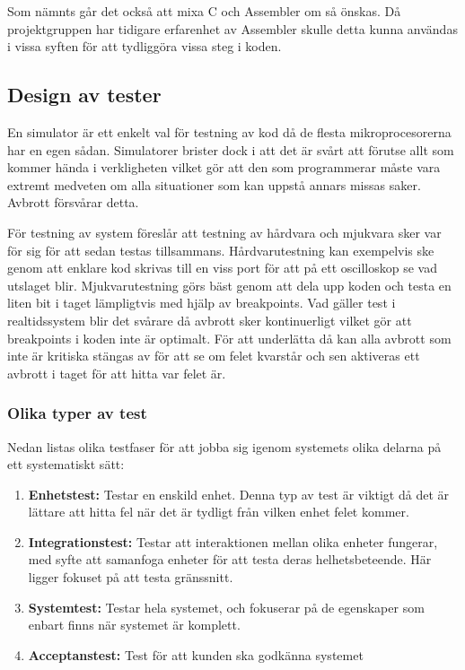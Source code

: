 \documentclass[11pt]{article}
\begin{document}
\begin{flushleft}
Som nämnts går det också att mixa C och Assembler om så önskas. Då projektgruppen har tidigare erfarenhet av Assembler skulle detta kunna användas i vissa syften för att tydliggöra vissa steg i koden. 


\subsection{Design av tester}
En simulator är ett enkelt val för testning av kod då de flesta mikroprocesorerna har en egen sådan. Simulatorer brister dock i att det är svårt att förutse allt som kommer hända i verkligheten vilket gör att den som programmerar måste vara extremt medveten om alla situationer som kan uppstå annars missas saker. Avbrott försvårar detta.\cite{RWD}

För testning av system föreslår \cite{RWD} att testning av hårdvara och mjukvara sker var för sig för att sedan testas tillsammans. Hårdvarutestning kan exempelvis ske genom att enklare kod skrivas till en viss port för att på ett oscilloskop se vad utslaget blir. Mjukvarutestning görs bäst genom att dela upp koden och testa en liten bit i taget lämpligtvis med hjälp av breakpoints. Vad gäller test i realtidssystem blir det svårare då avbrott sker kontinuerligt vilket gör att breakpoints i koden inte är optimalt. För att underlätta då kan alla avbrott som inte är kritiska stängas av för att se om felet kvarstår och sen aktiveras ett avbrott i taget för att hitta var felet är.

\subsubsection{Olika typer av test}
Nedan listas olika testfaser för att jobba sig igenom systemets olika delarna på ett systematiskt sätt:
\begin{enumerate}
	\item \textbf{Enhetstest:} Testar en enskild enhet. Denna typ av test är viktigt då det är lättare att hitta fel när det är tydligt från vilken enhet felet kommer.
	\item \textbf{Integrationstest:} Testar att interaktionen mellan olika enheter fungerar, med syfte att samanfoga enheter för att testa deras helhetsbeteende. Här ligger fokuset på att testa gränssnitt.
	\item \textbf{Systemtest:} Testar hela systemet, och fokuserar på de egenskaper som enbart finns när systemet är komplett.
	\item \textbf{Acceptanstest:} Test för att kunden ska godkänna systemet  
\end{enumerate}


\end{flushleft}
\end{document}
